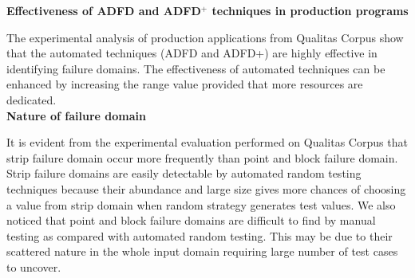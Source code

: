 \textbf{Effectiveness of ADFD and ADFD$^+$ techniques in production programs}

The experimental analysis of production applications from Qualitas Corpus show that the automated techniques (ADFD and ADFD+) are highly effective in identifying failure domains. The effectiveness of automated techniques can be enhanced by increasing the range value provided that more resources are dedicated.\\


\textbf{Nature of failure domain}

It is evident from the experimental evaluation performed on Qualitas Corpus that strip failure domain occur more frequently than point and block failure domain. Strip failure domains are easily detectable by automated random testing techniques because their abundance and large size gives more chances of choosing a value from strip domain when random strategy generates test values. We also noticed that point and block failure domains are difficult to find by manual testing as compared with automated random testing. This may be due to their scattered nature in the whole input domain requiring large number of test cases to uncover. 





